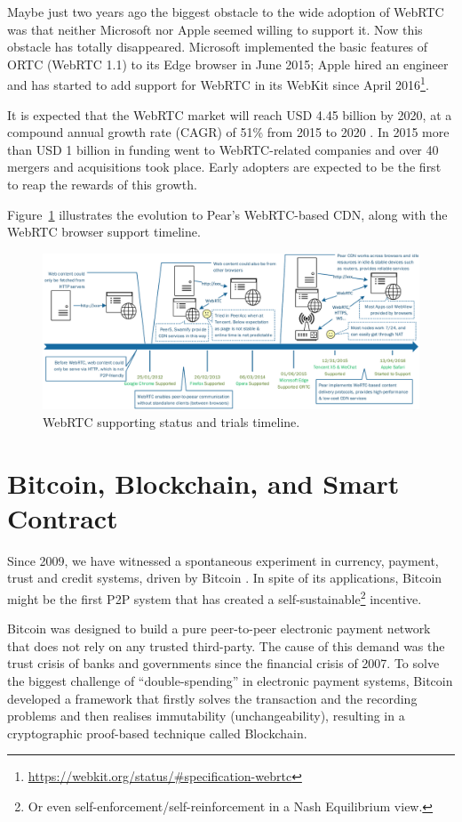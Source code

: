 Maybe just two years ago the biggest obstacle to the wide adoption of WebRTC was that neither Microsoft nor Apple seemed willing to support it. Now this obstacle has totally disappeared. Microsoft implemented the basic features of ORTC (WebRTC 1.1) to its Edge browser in June 2015; Apple hired an engineer \cite{apple-webrtc} and has started to add support for WebRTC in its WebKit since April 2016\footnote{\url{https://webkit.org/status/\#specification-webrtc}}. 

It is expected that the WebRTC market will reach USD 4.45 billion by 2020, at a compound annual growth rate (CAGR) of 51\% from 2015 to 2020 \cite{webrtc-market}. In 2015 more than USD 1 billion in funding went to WebRTC-related companies and over 40 mergers and acquisitions took place. Early adopters are expected to be the first to reap the rewards of this growth. 

Figure~\ref{fig:webrtc-timeline} illustrates the evolution to Pear's WebRTC-based CDN, along with the WebRTC browser support timeline.  
\begin{figure}[ht]
	\centering
	\includegraphics[width=1.00\textwidth]{fig/webrtc/webrtc_timeline.pdf}
	\caption{WebRTC supporting status and trials timeline.}\label{fig:webrtc-timeline}
\end{figure}

\section{Bitcoin, Blockchain, and Smart Contract}
Since 2009, we have witnessed a spontaneous experiment in currency, payment, trust and credit systems, driven by Bitcoin \cite{nakamoto2009bitcoin}. In spite of its applications, Bitcoin might be the first P2P system that has created a self-sustainable\footnote{Or even self-enforcement/self-reinforcement in a Nash Equilibrium view.} incentive. 

Bitcoin was designed to build a pure peer-to-peer electronic payment network that does not rely on any trusted third-party. The cause of this demand was the trust crisis of banks and governments since the financial crisis of 2007. To solve the biggest challenge of ``double-spending'' in electronic payment systems, Bitcoin developed a framework that firstly solves the transaction and the recording problems and then realises immutability (unchangeability), resulting in a cryptographic proof-based technique called Blockchain. 

